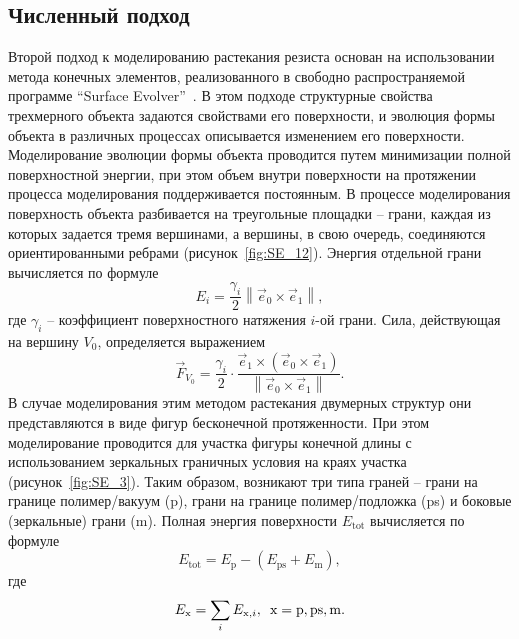 \subsection{Численный подход}
Второй подход к моделированию растекания резиста основан на использовании метода конечных элементов, реализованного в свободно распространяемой программе ``Surface Evolver''~\cite{Brakke_SE}.
В этом подходе структурные свойства трехмерного объекта задаются свойствами его поверхности, и эволюция формы объекта в различных процессах описывается изменением его поверхности.
Моделирование эволюции формы объекта проводится путем минимизации полной поверхностной энергии, при этом объем внутри поверхности на протяжении процесса моделирования поддерживается постоянным.
В процессе моделирования поверхность объекта разбивается на треугольные площадки -- грани, каждая из которых задается тремя вершинами, а вершины, в свою очередь, соединяются ориентированными ребрами (рисунок~\ref{fig:SE_12}).
Энергия отдельной грани вычисляется по формуле
\begin{equation}
	E_i=\frac{\gamma_i}{2}\left\|\vec{e}_0 \times \vec{e}_1\right\|,
\end{equation}
где $\gamma_i$ -- коэффициент поверхностного натяжения $i$-ой грани. Сила, действующая на вершину $V_0$, определяется выражением
\begin{equation}
	\vec{F}_{V_0}=\frac{\gamma_i}{2} \cdot \frac{\vec{e}_1 \times\left(\vec{e}_0 \times \vec{e}_1\right)}{\left\|\vec{e}_0 \times \vec{e}_1\right\|}.
\end{equation}
В случае моделирования этим методом растекания двумерных структур они представляются в виде фигур бесконечной протяженности. При этом моделирование проводится для участка фигуры конечной длины с использованием зеркальных граничных условия на краях участка (рисунок~\ref{fig:SE_3}). Таким образом, возникают три типа граней -- грани на границе полимер/вакуум (p), грани на границе полимер/подложка (ps) и боковые (зеркальные) грани (m). Полная энергия поверхности $E_\mathrm{tot}$ вычисляется по формуле
\begin{equation}
	E_\mathrm{tot} = E_\mathrm{p} - (E_\mathrm{ps} + E_\mathrm{m}),
\end{equation}
где 
\begin{equation}
	E_\mathrm{x} = \sum_{i} E_{\mathrm{x},i}, \hspace{0.5em} \mathrm{x} = \mathrm{p}, \mathrm{ps}, \mathrm{m}.
\end{equation}

